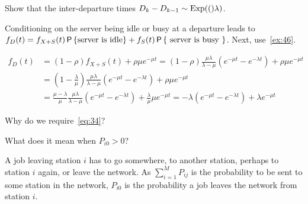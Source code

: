 \begin{exercise}\label{ex:63}
Show that the inter-departure times $D_k -D_{k-1} \sim \Exp(\lambda)$.
\begin{hint}
Conditioning on the server being idle or busy at a departure leads to
$f_D(t) = f_{X+S}(t) \P{\text{server is idle}} + f_S(t) \P{\text{ server is busy }}$.
Next, use~\cref{ex:46}.
\end{hint}
\begin{solution}
 \begin{align*}
 f_D(t)
&= (1-\rho) f_{X+S}(t) + \rho \mu e^{-\mu t}
= (1-\rho) \frac{\mu\lambda}{\lambda-\mu} \left(e^{-\mu t}-e^{-\lambda t}\right) + \rho \mu e^{-\mu t} \\
&= \left(1-\frac{\lambda}\mu\right) \frac{\mu\lambda}{\lambda-\mu}\left(e^{-\mu t}-e^{-\lambda t}\right) + \rho \mu e^{-\mu t} \\
&= \frac{\mu-\lambda}\mu \frac{\mu\lambda}{\lambda-\mu}\left(e^{-\mu t}-e^{-\lambda t}\right) + \frac\lambda \mu \mu e^{-\mu t}
= - \lambda\left(e^{-\mu t}-e^{-\lambda t}\right) + \lambda e^{-\mu t}
 \end{align*}
\end{solution}
\end{exercise}


\begin{exercise}\label{ex:on:3}
  Why do we require~\cref{eq:34}?
\begin{hint}
 What does it mean when $P_{i 0 } > 0$?
\end{hint}
\begin{solution}
  A job leaving station $i$ has to go somewhere, to another station, perhaps to station $i$ again, or leave the network.
  As $\sum_{i=1}^MP_{i j}$ is the probability to be sent to some station in the network, $P_{i 0} $ is the probability a job leaves the network from station $i$.
\end{solution}
\end{exercise}


